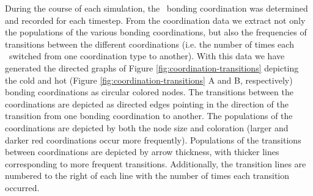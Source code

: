 During the course of each simulation, the \suldiox~bonding coordination was determined and recorded for each timestep. From the coordination data we extract not only the populations of the various bonding coordinations, but also the frequencies of transitions between the different coordinations (i.e. the number of times each \suldiox~switched from one coordination type to another). With this data we have generated the directed graphs of Figure \ref{fig:coordination-transitions} depicting the cold and hot (Figure \ref{fig:coordination-transitions} A and B, respectively) bonding coordinations as circular colored nodes.\cite{Ellson2004,Gansner1999} The transitions between the coordinations are depicted as directed edges pointing in the direction of the transition from one bonding coordination to another. The populations of the coordinations are depicted by both the node size and coloration (larger and darker red coordinations occur more frequently). Populations of the transitions between coordinations are depicted by arrow thickness, with thicker lines corresponding to more frequent transitions. Additionally, the transition lines are numbered to the right of each line with the number of times each transition occurred. 

